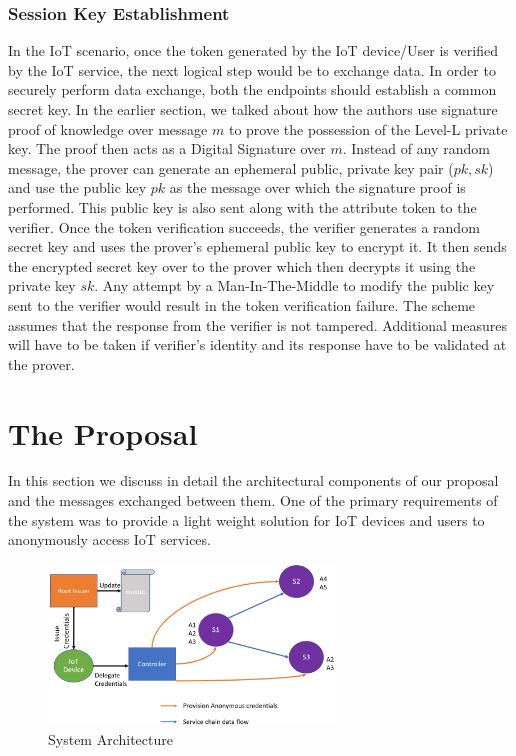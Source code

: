 \documentclass[journal]{IEEEtran}
\begin{document}
\subsubsection{Session Key Establishment}
In the IoT scenario, once the token generated by the IoT device/User is verified by the IoT service, the next logical step would be to exchange data. In order to securely perform data exchange, both the endpoints should establish a common secret key. In the earlier section, we talked about how the authors use signature proof of knowledge over message $m$ to prove the possession of the Level-L private key. The proof then acts as a Digital Signature over $m$. Instead of any random message, the prover can generate an ephemeral public, private key pair ($pk,sk$) and use the public key $pk$ as the message over which the signature proof is performed. This public key is also sent along with the attribute token to the verifier. Once the token verification succeeds, the verifier generates a random secret key and uses the prover's ephemeral public key to encrypt it. It then sends the encrypted secret key over to the prover which then decrypts it using the private key $sk$. Any attempt by a Man-In-The-Middle to modify the public key sent to the verifier would result in the token verification failure. The scheme assumes that the response from the verifier is not tampered. Additional measures will have to be taken if verifier's identity and its response have to be validated at the prover.

\section{The Proposal} \label{proposal}
In this section we discuss in detail the architectural components of our proposal and the messages exchanged between them. One of the primary requirements of the system was to provide a light weight solution for IoT devices and users to anonymously access IoT services. 

\begin{figure}[htbp]
\centerline{\includegraphics[width=3in]{architecture.png}}
\caption{System Architecture}
\label{fig:sysarch}
\end{figure}
\end{document}
